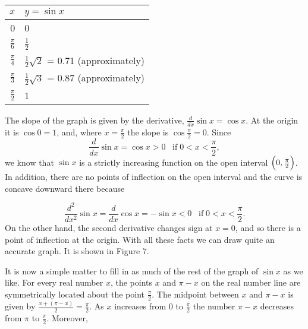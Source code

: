 \begin{table}
\centering
\begin{tabular}{r|l}\hline
                $x$ & $y = \sin x$ \\ \hline
                    0 & 0\\
$\frac{\pi}{6}$ & $\frac{1}{2}$ \\
$\frac{\pi}{4}$ & $\frac{1}{2} \sqrt 2$ = 0.71 (approximately) \\
$\frac{\pi}{3}$ & $\frac{1}{2} \sqrt 3$ = 0.87 (approximately) \\
$\frac{\pi}{2}$ & 1\\\hline
\end{tabular}
\caption{}
\label{table 6.2}
\end{table}
\medskip

\noindent The slope of the graph is given by the derivative, $\frac{d}{dx} \sin x = \cos x$. 
At the origin it is $\cos 0 = 1$, and, where $x = \frac{\pi}{2}$ the slope is $\cos \frac{\pi}{2} = 0$. 
Since
$$
\frac{d}{dx} \sin x = \cos x > 0 \;\;\;\mbox{if}\; 0 < x < \frac{\pi}{2},
$$
\noindent we know that $\sin x$ is a strictly increasing function on the open interval $\Bigl(0, \frac{\pi}{2} \Bigr)$.  In addition, there are no points of inflection on the open interval and the curve is concave downward there because

$$
\frac{d^2}{dx^2} \sin x = \frac{d}{dx} \cos x = -\sin x < 0 \;\;\; \mbox{if}\; 0 < x < \frac{\pi}{2}.
$$
\noindent On the other hand, the second derivative changes sign at $x = 0$, and so there is a point of inflection at the origin. With all these facts we can draw quite an accurate graph. It is shown in Figure 7.  


It is now a simple matter to fill in as much of the rest of the graph of $\sin x$ as we like. For every
real number $x$, the points $x$ and $\pi - x$ on the real number line are symmetrically located about the point $\frac{\pi}{2}$. The midpoint between $x$ and $\pi - x$ is given by $\frac{x + (\pi - x)}{2} = \frac{\pi}{2}$. As $x$ increases from 0 to $\frac{\pi}{2}$ the number $\pi - x$ decreases from $\pi$ to $\frac{\pi}{2}$.   Moreover,


